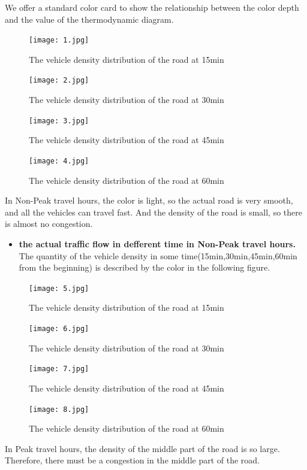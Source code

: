 \documentclass{mcmthesis}
\begin{document}
\indent We offer a standard color card to show the relationship between the color depth and the value of the thermodynamic diagram.

\begin{figure}[H]
	\centerline{\texttt{[image: 1.jpg]}}
	\caption{The vehicle density distribution of the road at 15min}	
\end{figure}
\begin{figure}[H]
	\centerline{\texttt{[image: 2.jpg]}}
	\caption{The vehicle density distribution of the road at 30min}	
\end{figure}
\begin{figure}[H]
	\centerline{\texttt{[image: 3.jpg]}}
	\caption{The vehicle density distribution of the road at 45min}	
\end{figure}
\begin{figure}[H]
	\centerline{\texttt{[image: 4.jpg]}}
	\caption{The vehicle density distribution of the road at 60min}	
\end{figure}
\indent\indent In Non-Peak travel hours, the color is light, so the actual road is very smooth, and all the vehicles can travel fast. And the density of the road is small, so there is almost no congestion.
\begin{itemize}
\item{\textbf{the actual traffic flow in defferent time in Non-Peak travel hours.}
 The quantity of the vehicle density in some time(15min,30min,45min,60min from the beginning) is described by the color in the following figure. }
\end{itemize}
\begin{figure}[H]
	\centerline{\texttt{[image: 5.jpg]}}
	\caption{The vehicle density distribution of the road at 15min}	
\end{figure}
\begin{figure}[H]
	\centerline{\texttt{[image: 6.jpg]}}
	\caption{The vehicle density distribution of the road at 30min}	
\end{figure}
\begin{figure}[H]
	\centerline{\texttt{[image: 7.jpg]}}
	\caption{The vehicle density distribution of the road at 45min}	
\end{figure}
\begin{figure}[H]
	\centerline{\texttt{[image: 8.jpg]}}
	\caption{The vehicle density distribution of the road at 60min}	
\end{figure}
\indent\indent In Peak travel hours, the density of the middle part of the road is so large. Therefore, there must be a congestion in the middle part of the road.
\end{document}
